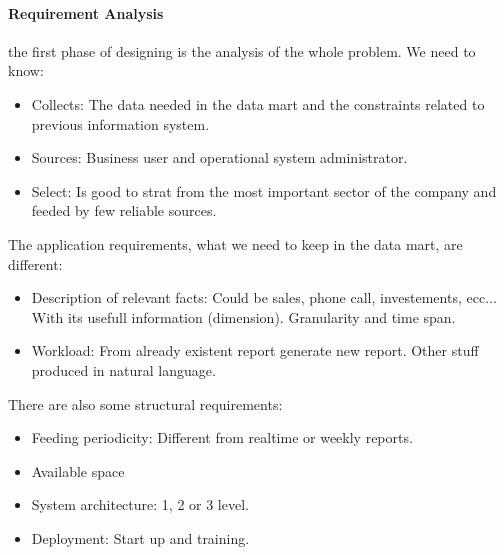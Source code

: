 \documentclass[12pt]{article}
\begin{document}
\paragraph{Requirement Analysis} the first phase of designing is the analysis of the whole problem. We need to know:
\begin{itemize}
  \item Collects: The data needed in the data mart and the constraints related to previous information system.
  \item Sources: Business user and operational system administrator.
  \item Select: Is good to strat from the most important sector of the company and feeded by few reliable sources.
\end{itemize}
The application requirements, what we need to keep in the data mart, are different:
\begin{itemize}
  \item Description of relevant facts: Could be sales, phone call, investements, ecc... With its usefull information (dimension). Granularity and time span.
  \item Workload: From already existent report generate new report. Other stuff produced in natural language.
\end{itemize}
There are also some structural requirements:
\begin{itemize}
  \item Feeding periodicity: Different from realtime or weekly reports.
  \item Available space
  \item System architecture: 1, 2 or 3 level.
  \item Deployment: Start up and training.
\end{itemize}
\end{document}
